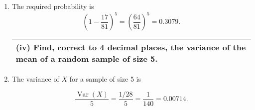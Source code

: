 \documentclass[a4paper,30pt]{article}
\begin{document}
\begin{enumerate}
\item The required probability is 
\[ \left( 1 - \frac{17}{81} \right)^5  = \left( \frac{64}{81} \right)^5 = 0.3079.\]

\newpage

    \begin{table}[ht!]
     \centering
     \begin{tabular}{|p{15cm}|}
     \hline        
\noindent (iv) Find, correct to 4 decimal places, the variance of the mean of a random sample of size 5.
\\ \hline
      \end{tabular}
    \end{table}

\item The variance of $X$ for a sample of size 5 is 


\[  \frac{\operatorname{Var}(X)}{5}  = \frac{1/28}{5}  = \frac{1}{140} =  0.00714.\]
\end{enumerate}
\end{document}
